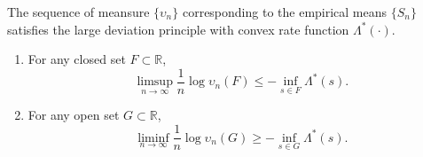 \begin{theorem}[Cram\'er]
The sequence of meansure $\{ \upsilon_n \}$ corresponding to the empirical means $\{ S_n \}$ satisfies the large deviation principle with convex rate function $\Lambda^* (\cdot )$.
\begin{enumerate}
\item For any closed set $F \subset \mathbb{R}$,
\begin{equation} \label{equation:CramerUpper}
\limsup_{n \rightarrow \infty} \frac{1}{n} \log \upsilon_n (F)
\leq - \inf_{s \in F} \Lambda^* (s) .
\end{equation}
\item For any open set $G \subset \mathbb{R}$,
\begin{equation} \label{equation:CramerLower}
\liminf_{n \rightarrow \infty} \frac{1}{n} \log \upsilon_n (G)
\geq - \inf_{s \in G} \Lambda^* (s) .
\end{equation}
\end{enumerate}
\end{theorem}
